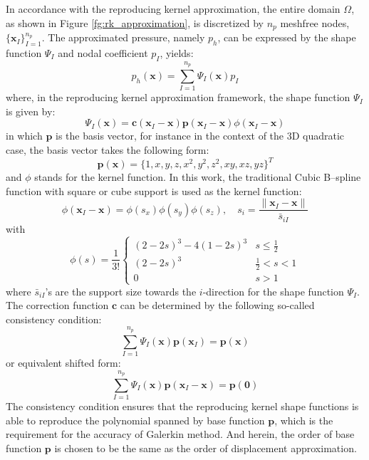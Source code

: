 In accordance with the reproducing kernel approximation, the entire domain $\Omega$, as shown in Figure \ref{fg:rk_approximation}, is discretized by $n_p$ meshfree nodes, $\{\boldsymbol{x}_I\}_{I=1}^{n_p}$. The approximated pressure, namely $p_h$, can be expressed by the shape function $\Psi_I$ and nodal coefficient $p_I$, yields:
\begin{equation}
p_h(\boldsymbol{x}) = \sum_{I=1}^{n_p} \Psi_I(\boldsymbol{x}) p_I
\end{equation}
where, in the reproducing kernel approximation framework, the shape function $\Psi_I$ is given by:
\begin{equation}\label{rkshape}
\Psi_I(\boldsymbol{x}) = \boldsymbol{c}(\boldsymbol{x}_I-\boldsymbol{x}) \boldsymbol{p}(\boldsymbol{x}_I-\boldsymbol{x}) \phi(\boldsymbol{x}_I - \boldsymbol{x})
\end{equation}
in which $\boldsymbol{p}$ is the basis vector, for instance in the context of the 3D quadratic case, the basis vector takes the following form:
\begin{equation}
\boldsymbol{p}(\boldsymbol{x}) = \{ 1, x, y, z, x^2, y^2, z^2, xy, xz, yz\}^T
\end{equation}
and $\phi$ stands for the kernel function. In this work, the traditional Cubic B--spline function with square or cube support is used as the kernel function:
\begin{equation}
\phi(\boldsymbol{x}_I-\boldsymbol{x}) = \phi(s_x) \phi(s_y) \phi(s_z), \quad s_i = \frac{\|\boldsymbol{x}_I - \boldsymbol{x}\|}{\bar{s}_{iI}}
\end{equation}
with
\begin{equation}
\phi(s) = \frac{1}{3!} \begin{cases}
(2-2s)^3 - 4(1-2s)^3 & s\le\frac{1}{2} \\
(2-2s)^3 &\frac{1}{2}<s<1 \\
0 & s> 1
\end{cases}
\end{equation}
where $\bar{s}_{iI}$'s are the support size towards the $i$-direction for the shape function $\Psi_I$. The correction function $\boldsymbol{c}$ can be determined by the following so-called consistency condition:
\begin{equation}\label{cc1}
\sum_{I=1}^{n_p} \Psi_I(\boldsymbol{x}) \boldsymbol{p}(\boldsymbol{x}_I) = \boldsymbol{p} (\boldsymbol{x})
\end{equation}
or equivalent shifted form:
\begin{equation}\label{cc2}
\sum_{I=1}^{n_p} \Psi_I(\boldsymbol{x}) \boldsymbol{p}(\boldsymbol{x}_I-\boldsymbol{x}) = \boldsymbol{p} (\boldsymbol{0})
\end{equation}
The consistency condition ensures that the reproducing kernel shape functions is able to reproduce the polynomial spanned by base function $\boldsymbol{p}$, which is the requirement for the accuracy of Galerkin method.
And herein, the order of base function $\boldsymbol p$ is chosen to be the same as the order of displacement approximation.

